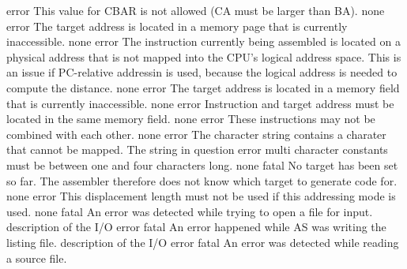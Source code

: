 \documentclass[12pt,twoside]{report}
\newcommand{\asname}{{AS}}
\begin{document}
\begin{description}
               {error}
               {This value for CBAR is not allowed (CA must be larger than BA).}
               {none}
               {error}
               {The target address is located in a memory page that is currently
                inaccessible.}
               {none}
               {error}
               {The instruction currently being assembled is located on a physical
                address that is not mapped into the CPU's logical address space.
                This is an issue if PC-relative addressin is used, because the
                logical address is needed to compute the distance.}
               {none}
               {error}
               {The target address is located in a memory field that is currently
                inaccessible.}
               {none}
               {error}
               {Instruction and target address must be located in the
                same memory field.}
               {none}
               {error}
               {These instructions may not be combined with each other.}
               {none}
               {error}
               {The character string contains a charater that cannot be mapped.}
               {The string in question}
               {error}
               {multi character constants must be between one and four characters long.}
               {none}
               {fatal}
               {No target has been set so far.  The assembler therefore does
                not know which target to generate code for.}
               {none}
               {error}
               {This displacement length must not be used if this addressing
                mode is used.}
               {none}
               {fatal}
               {An error was detected while trying to open a file for input.}
               {description of the I/O error}
               {fatal}
               {An error happened while \asname{} was writing the listing file.}
               {description of the I/O error}
               {fatal}
               {An error was detected while reading a source file.}

\end{description}
\end{document}
